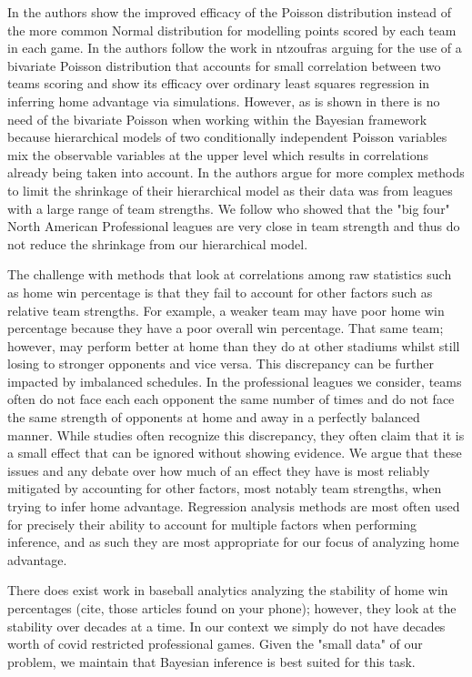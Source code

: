 In \cite{Lopez2018} the authors show the improved efficacy of the Poisson distribution instead of the more common Normal distribution \cite{GlickmanText2017} for modelling points scored by each team in each game. In \cite{Benz2020} the authors follow the work in ntzoufras arguing for the use of a bivariate Poisson distribution that accounts for small correlation between two teams scoring and show its efficacy over ordinary least squares regression in inferring home advantage via simulations. However, as is shown in \cite{Baio2010} there is no need of the bivariate Poisson when working within the Bayesian framework because hierarchical models of two conditionally independent Poisson variables mix the observable variables at the upper level which results in correlations already being taken into account. In \cite{Baio2010} the authors argue for more complex methods to limit the shrinkage of their hierarchical model as their data was from leagues with a large range of team strengths. We follow \cite{Lopez2018} who showed that the "big four" North American Professional leagues are very close in team strength and thus do not reduce the shrinkage from our hierarchical model.

The challenge with methods that look at correlations among raw statistics such as home win percentage is that they fail to account for other factors such as relative team strengths. For example, a weaker team may have poor home win percentage because they have a poor overall win percentage. That same team; however, may perform better at home than they do at other stadiums whilst still losing to stronger opponents and vice versa. This discrepancy can be further impacted by imbalanced schedules. In the professional leagues we consider, teams often do not face each each opponent the same number of times and do not face the same strength of opponents at home and away in a perfectly balanced manner. While studies often recognize this discrepancy, they often claim that it is a small effect that can be ignored \cite{Pollard2005a} without showing evidence. We argue that these issues and any debate over how much of an effect they have is most reliably mitigated by accounting for other factors, most notably team strengths, when trying to infer home advantage. Regression analysis methods are most often used for precisely their ability to account for multiple factors when performing inference, and as such they are most appropriate for our focus of analyzing home advantage.

There does exist work in baseball analytics analyzing the stability of home win percentages (cite, those articles found on your phone); however, they look at the stability over decades at a time. In our context we simply do not have decades worth of covid restricted professional games. Given the "small data" of our problem, we maintain that Bayesian inference is best suited for this task.



